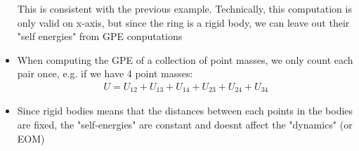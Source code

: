 \documentclass[10pt, portrait]{article}
\begin{document}
\begin{multicols*}{2}
\begin{itemize}
    This is consistent with the previous example. Technically, this computation is only valid on x-axis, but since the ring is a rigid body, we can leave out their "self energies" from GPE conputations
    \item When computing the GPE of a collection of point masses, we only count each pair once, e.g. if we have 4 point masses:
    \[
    \begin{aligned}
        U = U_{12} + U_{13} + U_{14} + U_{23} + U_{24} + U_{34}
    \end{aligned}
    \]
    \item Since rigid bodies means that the distances between each points in the bodies are fixed, the "self-energies" are constant and doesnt affect the "dynamics" (or EOM)    
\end{itemize}


\end{multicols*}
\end{document}
